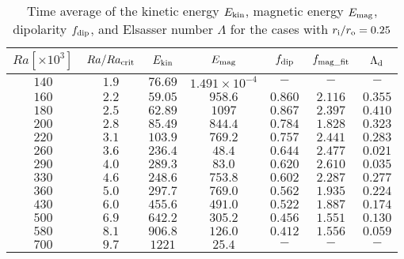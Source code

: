   \begin{table}
 \begin{center}
\caption{Time average of the kinetic energy $E_{\rm kin}$, magnetic energy $E_{\rm mag}$, dipolarity $f_{\rm dip}$, and Elsasser number $\Lambda$ for the cases with $r_{\rm i}/r_{\rm o} = 0.25$}
  \begin{tabular}{ccccccc}
    \hline
     $Ra[\times 10^3]$  &  $Ra/Ra_{\rm crit}$&  $E_{\rm kin}$  &  $E_{\rm mag}$ & $f_{\rm dip}$ & $f_{\rm mag\_fit}$ & $\Lambda_{\rm d}$\\
    \hline \hline    
    $140$  & $1.9$ &  $76.69$ & $1.491 \times 10^{-4}$ & $-$ & $-$ & $-$\\
    $160$  & $2.2$ &  $59.05$ & $958.6$ & $0.860$ & $2.116$ & $0.355$\\
    $180$  & $2.5$ &  $62.89$ & $1097$ & $0.867$ & $2.397$ & $0.410$\\
    $200$  & $2.8$ &  $85.49$ & $844.4$ & $0.784$ & $1.828$ & $0.323$\\
    $220$  & $3.1$ &  $103.9$ & $769.2$ & $0.757$ & $2.441$ & $0.283$\\
    $260$  & $3.6$ &  $236.4$ & $48.4$ & $0.644$ & $2.477$ & $0.021$\\
    $290$  & $4.0$ &  $289.3$ & $83.0$ & $0.620$ & $2.610$ & $0.035$\\
    $330$  & $4.6$ &  $248.6$ & $753.8$ & $0.602$ & $2.287$ & $0.277$\\
    $360$  & $5.0$ &  $297.7$ & $769.0$ & $0.562$ & $1.935$ & $0.224$\\
    $430$  & $6.0$ &  $455.6$ & $491.0$ & $0.522$ & $1.887$ & $0.174$\\
    $500$  & $6.9$ &  $642.2$ & $305.2$ & $0.456$ & $1.551$ & $0.130$\\
    $580$  & $8.1$ &  $906.8$ & $126.0$ & $0.412$ & $1.556$ & $0.059$\\
    $700$  & $9.7$ &  $1221$ & $25.4$ & $-$ & $-$ & $-$\\
    \hline
  \end{tabular}
 \end{center}
 \label{table:Summary_25}
\end{table}
 

